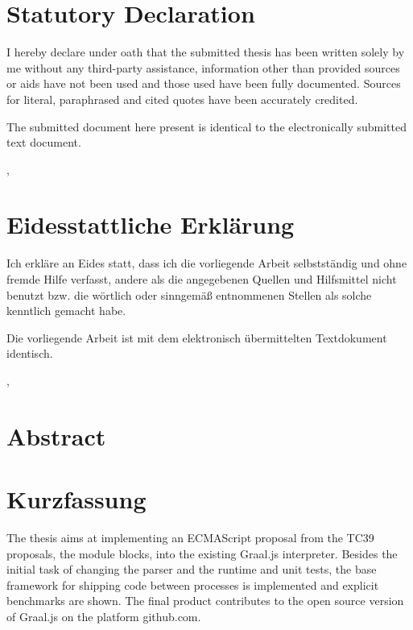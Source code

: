 
	\ifeng \chapter*{Statutory Declaration}
	I hereby declare under oath that the submitted thesis has been written solely by me without any third-party assistance, information other than provided sources or aids have not been used and those used have been fully documented. Sources for literal, paraphrased and cited quotes have been accurately credited.
	
	The submitted document here present is identical to the electronically submitted text document.
	
	\vskip1cm
	\place, \date
	
	\else \chapter*{Eidesstattliche Erklärung}
	Ich erkläre an Eides statt, dass ich die vorliegende Arbeit selbstständig und ohne fremde Hilfe verfasst, andere als die angegebenen Quellen und Hilfsmittel nicht benutzt bzw. die wörtlich oder sinngemäß entnommenen Stellen als solche kenntlich gemacht habe.

	Die vorliegende Arbeit ist mit dem elektronisch übermittelten Textdokument identisch.
	
	\vskip1cm
	\place, \date
	\fi


	\ifeng	\chapter*{Abstract}
	\else	\chapter*{Kurzfassung}
	\fi
		

The thesis aims at implementing an ECMAScript proposal from the TC39 proposals, the module blocks, into the existing Graal.js interpreter. Besides the initial task of changing the parser and the runtime and unit tests, the base framework for shipping code between processes is implemented and explicit benchmarks are shown. The final product contributes to the open source version of Graal.js on the platform github.com.


